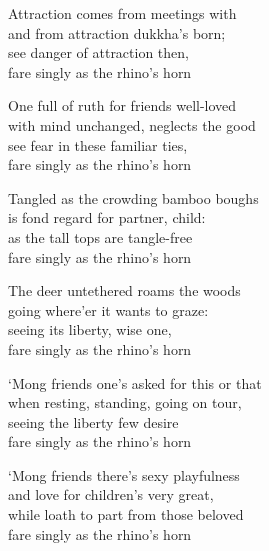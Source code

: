 \begin{MyDescription}{}  	
Attraction comes from meetings with\\
and from attraction dukkha's born;\\
see danger of attraction then,\\
fare singly as the rhino's horn
\end{MyDescription}     

\begin{MyDescription}{}  	
One full of ruth for friends well-loved\\
with mind unchanged, neglects the good\\
see fear in these familiar ties,\\
fare singly as the rhino's horn
\end{MyDescription} 
 
\begin{MyDescription}{}  	
Tangled as the crowding bamboo boughs\\
is fond regard for partner, child:\\
as the tall tops are tangle-free\\
fare singly as the rhino's horn	
 \end{MyDescription} 
 
 \begin{MyDescription}{}  	
The deer untethered roams the woods\\
going where'er it wants to graze:\\
seeing its liberty, wise one,\\
fare singly as the rhino's horn
 \end{MyDescription}   
 
  \begin{MyDescription}{}  	
`Mong friends one's asked for this or that\\
when resting, standing, going on tour,\\
seeing the liberty few desire\\
fare singly as the rhino's horn
  \end{MyDescription}
  
   \begin{MyDescription}{}  	
`Mong friends there's sexy playfulness\\ 
and love for children's very great,\\
while loath to part from those beloved\\
fare singly as the rhino's horn
   \end{MyDescription} 
       
